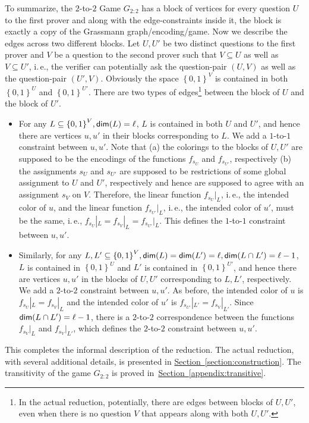 \documentclass[11pt]{article}
\numberwithin{equation}{section}
\theoremstyle{definition}
\theoremstyle{plain}
\newcommand{\ie}{i.\,e.}
\newcommand{\expref}[2]{\hyperref[#2]{#1~\ref{#2}}}
\newcommand\set[1]{{\left\{ #1 \right\}}}
\newcommand\power[1]{\set{0,1}^{#1}}
\begin{document}
To summarize, the $2$-to-$2$ Game $G_{2:2}$ has a block of vertices for every question $U$ to the first prover  and along with the
edge-constraints inside it, the block is exactly a copy of the Grassmann graph/encoding/game. Now we describe the edges across
two different blocks. Let $U, U'$ be two distinct questions to the first prover and $V$ be a question to the second prover such that
$V \subseteq U$ as well as $V \subseteq U'$, \ie, the verifier can potentially ask the question-pair $(U, V)$ as well as the question-pair $(U', V)$.
Obviously the space $\power{V}$ is contained in both $\power{U}$ and $\power{U'}$. There are two types of edges\footnote{In the actual reduction,
potentially, there are edges between blocks of $U, U'$, even when there is no question $V$ that appears along with both $U, U'$.}
 between the block of
$U$ and  the block of $U'$.
\begin{itemize}
\item For any $L \subseteq \power{V}, {\sf dim}(L)=\ell$, $L$ is contained in
both $U$ and $U'$, and hence there are vertices $u, u'$ in their
blocks corresponding to $L$. We add a $1$-to-$1$ constraint between $u, u'$.
Note that (a) the colorings to the blocks of $U, U'$ are supposed to be the
encodings of the
%
functions $f_{s_U}$ and $f_{s_{U'}}$, respectively
%
(b) the assignments $s_U$ and $s_{U'}$ are supposed to be restrictions of some
global assignment to $U$ and $U'$, respectively %
and hence are supposed to
agree with an assignment $s_V$ on $V$. Therefore, the linear function $f_{s_U}|_L$,
\ie, the intended color of $u$, and the linear function $f_{s_{U'}}|_L$, \ie, the
intended color of $u'$, must be the same, \ie, $f_{s_U}|_L = f_{s_V}|_L = f_{s_{U'}}|_L$.
      This defines the $1$-to-$1$ constraint between $u, u'$.
\item Similarly, for any $L, L' \subseteq \power{V}, {\sf dim}(L)={\sf dim}(L')=\ell, {\sf dim}(L\cap L')=\ell-1$,
 $L$ is contained in $\power{U}$ and $L'$ is contained in $\power{U'}$, and hence there are vertices $u, u'$ in the blocks of $U, U'$ %
%
corresponding to $L, L'$, respectively.  We add a $2$-to-$2$ constraint between $u, u'$. As before,
       the intended color of $u$ is $f_{s_U}|_L = f_{s_V}|_L$ and the intended color of $u'$ is $f_{s_{U'}}|_{L'} = f_{s_V}|_{L'}$. Since
       ${\sf dim}(L \cap L')=\ell-1$, there is a $2$-to-$2$ correspondence between the functions $f_{s_V}|_L$ and $f_{s_V}|_{L'}$,
       which defines the $2$-to-$2$ constraint between $u, u'$.
\end{itemize}
This completes the informal description of the reduction. The actual reduction, with several additional details, is
presented in \expref{Section}{section:construction}. The transitivity of the game $G_{2:2}$ is proved in~\expref{Section}{appendix:transitive}.
\end{document}
